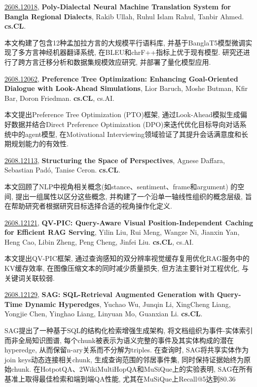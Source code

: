 \documentclass[9pt, a4paper]{article}
\theoremstyle{plain}
\theoremstyle{definition}
\theoremstyle{remark}
\newcommand{\arxivwithtarget}[3]{\hypertarget{#1}{}\href{https://arxiv.org/abs/#1}{#1}, \textbf{\textcolor{arxivblue}{#2}}, #3. }
\begin{document}
\arxivwithtarget{2608.12018}{Poly-Dialectal Neural Machine Translation System for Bangla Regional Dialects}{Rakib Ullah, Ruhul Islam Rahul, Tanbir Ahmed}\textbf{cs.CL}.

本文构建了包含12种孟加拉方言的大规模平行语料库, 并基于BanglaT5模型微调实现了多方言神经机器翻译系统, 在BLEU和chrF++指标上优于现有模型. 研究还进行了跨方言迁移分析和数据集规模效应研究, 并部署了量化模型应用.


\arxivwithtarget{2608.12062}{Preference Tree Optimization: Enhancing Goal-Oriented Dialogue with Look-Ahead Simulations}{Lior Baruch, Moshe Butman, Kfir Bar, Doron Friedman}\textbf{cs.CL}, cs.AI.

本文提出Preference Tree Optimization (PTO)框架, 通过Look-Ahead模拟生成偏好数据并结合Direct Preference Optimization (DPO)来迭代优化目标导向对话系统中的agent模型, 在Motivational Interviewing领域验证了其提升会话满意度和长期规划能力的有效性.


\arxivwithtarget{2608.12113}{Structuring the Space of Perspectives}{Agnese Daffara, Sebastian Padó, Tanise Ceron}\textbf{cs.CL}.

本文回顾了NLP中视角相关概念(如stance、sentiment、frame和argument) 的空间, 提出一组属性以区分这些概念, 并构建了一个沿单一轴线性组织的概念层级, 旨在帮助研究者根据研究目标选择合适的视角操作化定义.


\arxivwithtarget{2608.12121}{QV-PIC: Query-Aware Visual Position-Independent Caching for Efficient RAG Serving}{Yilin Liu, Rui Meng, Wangze Ni, Jianxin Yan, Heng Cao, Libin Zheng, Peng Cheng, Jinfei Liu}\textbf{cs.CL}, cs.AI.

本文提出QV-PIC框架, 通过查询感知的双分辨率视觉缓存复用优化RAG服务中的KV缓存效率, 在图像压缩文本的同时减少质量损失, 但方法主要针对工程优化, 与关键词关联较弱.


\arxivwithtarget{2608.12129}{SAG: SQL-Retrieval Augmented Generation with Query-Time Dynamic Hyperedges}{Yuchao Wu, Junqin Li, XingCheng Liang, Yongjie Chen, Yinghao Liang, Linyuan Mo, Guanxian Li}\textbf{cs.CL}.

SAG提出了一种基于SQL的结构化检索增强生成架构, 将文档组织为事件-实体索引而非全局知识图谱, 每个chunk被表示为语义完整的事件及其实体构成的潜在hyperedge, 从而保留n-ary关系而不分解为triples. 在查询时, SAG将共享实体作为join keys动态连接相关chunk, 生成查询范围的邻居事件集, 同时保持证据始终为原始chunk. 在HotpotQA、2WikiMultiHopQA和MuSiQue上的实验表明, SAG在所有基准上取得最佳检索和端到端QA性能, 尤其在MuSiQue上Recall@5达到80.36%
\end{document}
